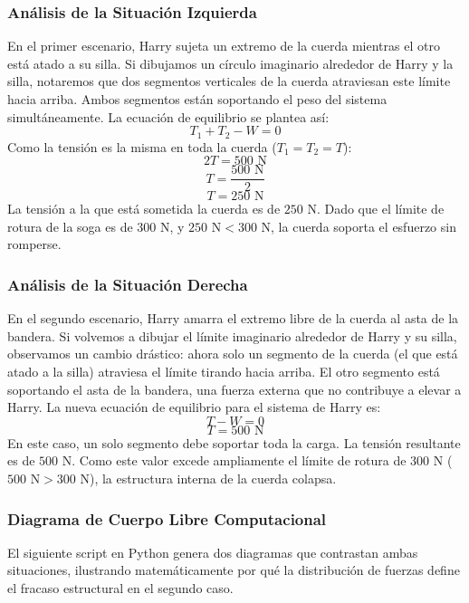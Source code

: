 \documentclass[12pt,letterpaper]{article}
\begin{document}
\subsubsection*{Análisis de la Situación Izquierda}
En el primer escenario, Harry sujeta un extremo de la cuerda mientras el otro está atado a su silla. Si dibujamos un círculo imaginario alrededor de Harry y la silla, notaremos que dos segmentos verticales de la cuerda atraviesan este límite hacia arriba. Ambos segmentos están soportando el peso del sistema simultáneamente.
La ecuación de equilibrio se plantea así:
$$T_{1} + T_{2} - W = 0$$
Como la tensión es la misma en toda la cuerda ($T_{1} = T_{2} = T$):
$$2T = 500\text{ N}$$
$$T = \frac{500\text{ N}}{2}$$
$$T = 250\text{ N}$$
La tensión a la que está sometida la cuerda es de $250\text{ N}$. Dado que el límite de rotura de la soga es de $300\text{ N}$, y $250\text{ N} < 300\text{ N}$, la cuerda soporta el esfuerzo sin romperse.

\subsubsection*{Análisis de la Situación Derecha}
En el segundo escenario, Harry amarra el extremo libre de la cuerda al asta de la bandera. Si volvemos a dibujar el límite imaginario alrededor de Harry y su silla, observamos un cambio drástico: ahora solo un segmento de la cuerda (el que está atado a la silla) atraviesa el límite tirando hacia arriba. El otro segmento está soportando el asta de la bandera, una fuerza externa que no contribuye a elevar a Harry.
La nueva ecuación de equilibrio para el sistema de Harry es:
$$T - W = 0$$
$$T = 500\text{ N}$$
En este caso, un solo segmento debe soportar toda la carga. La tensión resultante es de $500\text{ N}$. Como este valor excede ampliamente el límite de rotura de $300\text{ N}$ ($500\text{ N} > 300\text{ N}$), la estructura interna de la cuerda colapsa.

\subsubsection*{Diagrama de Cuerpo Libre Computacional}
El siguiente script en Python genera dos diagramas que contrastan ambas situaciones, ilustrando matemáticamente por qué la distribución de fuerzas define el fracaso estructural en el segundo caso.
\end{document}
